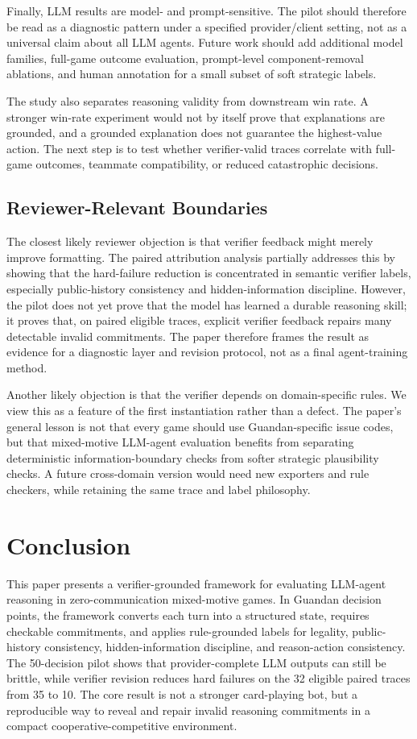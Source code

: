 \documentclass[sigconf,anonymous,review]{acmart}
\begin{document}
Finally, LLM results are model- and prompt-sensitive. The pilot should therefore be read as a diagnostic pattern under a specified provider/client setting, not as a universal claim about all LLM agents. Future work should add additional model families, full-game outcome evaluation, prompt-level component-removal ablations, and human annotation for a small subset of soft strategic labels.

The study also separates reasoning validity from downstream win rate. A stronger win-rate experiment would not by itself prove that explanations are grounded, and a grounded explanation does not guarantee the highest-value action. The next step is to test whether verifier-valid traces correlate with full-game outcomes, teammate compatibility, or reduced catastrophic decisions.

\subsection{Reviewer-Relevant Boundaries}

The closest likely reviewer objection is that verifier feedback might merely improve formatting. The paired attribution analysis partially addresses this by showing that the hard-failure reduction is concentrated in semantic verifier labels, especially public-history consistency and hidden-information discipline. However, the pilot does not yet prove that the model has learned a durable reasoning skill; it proves that, on paired eligible traces, explicit verifier feedback repairs many detectable invalid commitments. The paper therefore frames the result as evidence for a diagnostic layer and revision protocol, not as a final agent-training method.

Another likely objection is that the verifier depends on domain-specific rules. We view this as a feature of the first instantiation rather than a defect. The paper's general lesson is not that every game should use Guandan-specific issue codes, but that mixed-motive LLM-agent evaluation benefits from separating deterministic information-boundary checks from softer strategic plausibility checks. A future cross-domain version would need new exporters and rule checkers, while retaining the same trace and label philosophy.

\section{Conclusion}

This paper presents a verifier-grounded framework for evaluating LLM-agent reasoning in zero-communication mixed-motive games. In Guandan decision points, the framework converts each turn into a structured state, requires checkable commitments, and applies rule-grounded labels for legality, public-history consistency, hidden-information discipline, and reason-action consistency. The 50-decision pilot shows that provider-complete LLM outputs can still be brittle, while verifier revision reduces hard failures on the 32 eligible paired traces from 35 to 10. The core result is not a stronger card-playing bot, but a reproducible way to reveal and repair invalid reasoning commitments in a compact cooperative-competitive environment.



\end{document}
